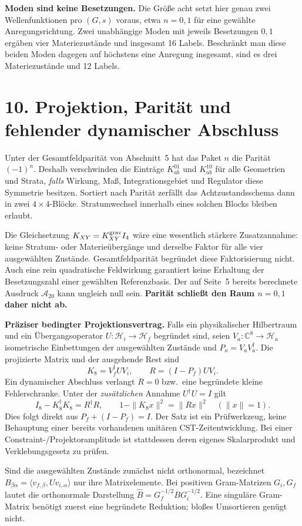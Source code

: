 \documentclass[10pt,a4paper]{article}
\newcommand{\sect}[1]{\section*{\color{navy}#1}}
\begin{document}
\textbf{Moden sind keine Besetzungen.} Die Größe acht setzt hier genau
zwei Wellenfunktionen pro $(G,s)$ voraus, etwa $n=0,1$ für eine gewählte
Anregungsrichtung. Zwei unabhängige Moden mit jeweils Besetzungen $0,1$
ergäben vier Materiezustände und insgesamt 16 Labels. Beschränkt man
diese beiden Moden dagegen auf höchstens eine Anregung insgesamt,
sind es drei Materiezustände und 12 Labels.

\newpage
\sect{10. Projektion, Parität und fehlender dynamischer Abschluss}
Unter der Gesamtfeldparität von Abschnitt~5 hat das Paket $n$ die Parität
$(-1)^n$. Deshalb verschwinden die Einträge $K_{ab}^{01}$ und
$K_{ab}^{10}$ für alle Geometrien und Strata, \emph{falls} Wirkung, Maß,
Integrationsgebiet und Regulator diese Symmetrie besitzen. Sortiert nach
Parität zerfällt das Achtzustandsschema dann in zwei $4\times4$-Blöcke.
Stratumwechsel innerhalb eines solchen Blocks bleiben erlaubt.

Die Gleichsetzung $K_{XY}=K^{\rm grav}_{XY}I_4$ wäre eine wesentlich stärkere
Zusatzannahme: keine Stratum- oder Materieübergänge und derselbe Faktor für
alle vier ausgewählten Zustände. Gesamtfeldparität begründet diese
Faktorisierung nicht. Auch eine rein quadratische Feldwirkung garantiert
keine Erhaltung der Besetzungszahl einer gewählten Referenzbasis.
Der auf Seite~5 bereits berechnete Ausdruck $\mathcal A_{20}$ kann ungleich
null sein. \textbf{Parität schließt den Raum $n=0,1$ daher nicht ab.}

\textbf{Präziser bedingter Projektionsvertrag.} Falls ein physikalischer
Hilbertraum und ein Übergangsoperator $U:\mathcal H_i\to\mathcal H_f$
begründet sind, seien $V_a:\mathbb C^8\to\mathcal H_a$ isometrische
Einbettungen der ausgewählten Zustände und $P_a=V_aV_a^\dagger$.
Die projizierte Matrix und der ausgehende Rest sind
\[
K_8=V_f^\dagger U V_i,
\qquad R=(I-P_f)UV_i.
\]
Ein dynamischer Abschluss verlangt $R=0$ bzw.~eine begründete kleine
Fehlerschranke. Unter der \emph{zusätzlichen} Annahme $U^\dagger U=I$ gilt
\[
\boxed{I_8-K_8^\dagger K_8=R^\dagger R,}
\qquad
1-\|K_8x\|^2=\|Rx\|^2\quad(\|x\|=1).
\]
Dies folgt direkt aus $P_f+(I-P_f)=I$. Der Satz ist ein Prüfwerkzeug,
keine Behauptung einer bereits vorhandenen unitären CST-Zeitentwicklung.
Bei einer Constraint-/Projektoramplitude ist stattdessen deren eigenes
Skalarprodukt und Verklebungsgesetz zu prüfen.

Sind die ausgewählten Zustände zunächst nicht orthonormal, bezeichnet
$B_{\beta\alpha}=\langle v_{f,\beta},Uv_{i,\alpha}\rangle$ nur ihre
Matrixelemente. Bei positiven Gram-Matrizen $G_i,G_f$ lautet die orthonormale
Darstellung $\widehat B=G_f^{-1/2}BG_i^{-1/2}$. Eine singuläre Gram-Matrix
benötigt zuerst eine begründete Reduktion; bloßes Umsortieren genügt nicht.
\end{document}
